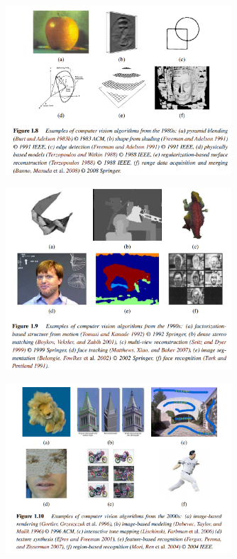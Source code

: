 \begin{figure}[H]
    \centerfloat
    \includegraphics[width=0.75\textwidth]{img/80s.png}
\end{figure}

\begin{figure}[H]
    \centerfloat
    \includegraphics[width=0.75\textwidth]{img/90s.png}
\end{figure}

\begin{figure}[H]
    \centerfloat
    \includegraphics[width=0.75\textwidth]{img/00s.png}
\end{figure}


